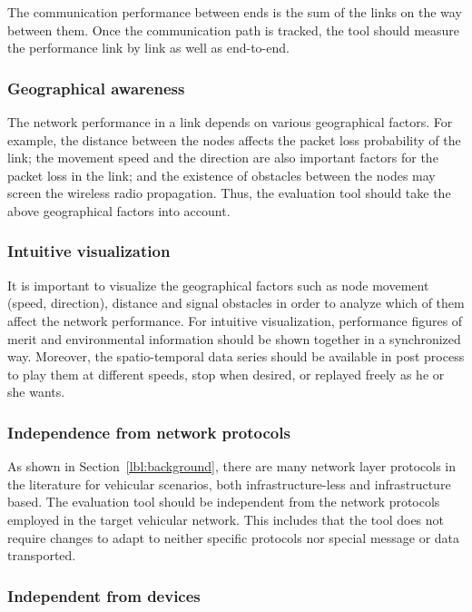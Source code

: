 \documentclass[fonts]{icst}
\begin{document}
The communication performance between ends is the sum of the links on the way
between them. Once the communication path is tracked, the tool should measure
the performance link by link as well as end-to-end. 

\subsubsection{Geographical awareness} 

The network performance in a link depends on various geographical factors. For
example, the distance between the nodes affects the packet loss probability of
the link; the movement speed and the direction are also important factors for
the packet loss in the link; and the existence of obstacles between the nodes
may screen the wireless radio propagation. Thus, the evaluation tool should take
the above geographical factors into account. 

\subsubsection{Intuitive visualization}

It is important to visualize the geographical factors such as node movement
(speed, direction), distance and signal obstacles in order to analyze which of them
affect the network performance. For intuitive visualization, performance figures
of merit and environmental information should be shown together in a
synchronized way. Moreover, the spatio-temporal data series should be available
in post process to play them at different speeds, stop when desired, or replayed
freely as he or she wants. 

\subsubsection{Independence from network protocols}

As shown in Section~\ref{lbl:background}, there are many network layer protocols
in the literature for vehicular scenarios, both infrastructure-less and
infrastructure based. The evaluation tool should be independent from the network
protocols employed in the target vehicular network. This includes that the tool
does not require changes to adapt to neither specific protocols nor special
message or data transported. 

\subsubsection{Independent from devices} 
\end{document}
